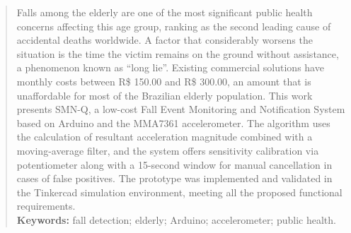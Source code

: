 \documentclass[a4paper,12pt]{article}
\newcommand{\keyword}[1]{\textsf{#1}}
\begin{document}
\begin{abstract}
\noindent
Falls among the elderly are one of the most significant public health concerns affecting this age group, ranking as the second leading cause of accidental deaths worldwide. A factor that considerably worsens the situation is the time the victim remains on the ground without assistance, a phenomenon known as ``long lie''. Existing commercial solutions have monthly costs between R\$ 150.00 and R\$ 300.00, an amount that is unaffordable for most of the Brazilian elderly population. This work presents SMN-Q, a low-cost Fall Event Monitoring and Notification System based on Arduino and the MMA7361 accelerometer. The algorithm uses the calculation of resultant acceleration magnitude combined with a moving-average filter, and the system offers sensitivity calibration via potentiometer along with a 15-second window for manual cancellation in cases of false positives. The prototype was implemented and validated in the Tinkercad simulation environment, meeting all the proposed functional requirements.
\\\textbf{\keyword{Keywords:}} fall detection; elderly; Arduino; accelerometer; public health.
\end{abstract}

 \onehalfspace  %
 \setlength{\parindent}{1.25cm}






 \newpage
{}


\end{document}
